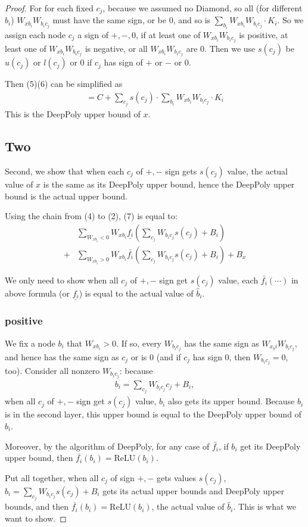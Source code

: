 \documentclass[]{article}
\theoremstyle{definition}
\newcommand{\ReLU}{\mathrm{ReLU}}
\begin{document}
\begin{proof}
For for each fixed $c_j$, because we assumed no Diamond, so all (for different $b_i$) $W_{xb_i}W_{b_ic_j}$ must have the same sign, or be $0$, and so is $\sum_{b_i}W_{xb_i}W_{b_ic_j}\cdot K_i$. So we assign each node $c_j$ a sign of $+,-,0$,  if at least one of $W_{xb_i}W_{b_ic_j}$ is positive, at least one of $W_{xb_i}W_{b_ic_j}$ is negative, or all $W_{xb_i}W_{b_ic_j}$ are 0. Then we use $s(c_j)$ be $u(c_j)$ or $l(c_j)$ or $0$ if $c_j$ has sign of $+$ or $-$ or $0$.



Then (5)(6) can be simplified as \begin{align}
	=C+\sum_{c_j}s(c_j)\cdot\sum_{b_i}W_{xb_i}W_{b_ic_j}\cdot K_i
\end{align} This is the DeepPoly upper bound of $x$.

\subsection*{Two} Second, we show that when each $c_j$ of $+,-$ sign gets $s(c_j)$ value, the actual value of $x$ is the same as its DeepPoly upper bound, hence the DeepPoly upper bound is the actual upper bound.

Using the chain from (4) to (2), (7) is equal to: \begin{align*}
&\sum_{W_{xb_i}<0}W_{xb_i}\underline{f_i}(\sum_{c_j}W_{b_ic_j}s(c_j)+B_i)\\
+&\sum_{W_{xb_i}>0}W_{xb_i}\bar{f_i}(\sum_{c_j}W_{b_ic_j}s(c_j)+B_i)+B_x
\end{align*} 

We only need to show when all $c_j$ of $+,-$ sign get $s(c_j)$ value, each $\bar{f_i}(\cdots)$ in above formula (or $\underline{f_i}$) is equal to the actual value of $\hat{b}_i$. 

\subsubsection*{positive} We fix a node $b_i$ that $W_{xb_i}>0$. If so, every $W_{b_ic_j}$ has the same sign as $W_{x_bi}W_{b_ic_j}$, and hence has the same sign as $c_j$ or is $0$ (and if $c_j$ has sign $0$, then $W_{b_ic_j}=0$, too). Consider all nonzero $W_{b_ic_j}$: because \begin{align}
	b_i = \sum_{c_j} W_{b_ic_j}c_j+B_i,
\end{align}  when all $c_j$ of $+,-$ sign get $s(c_j)$ value, $b_i$ also gets its upper bound. Because $b_i$ is in the second layer, this upper bound is equal to the DeepPoly upper bound of $b_i$. 


Moreover, by the algorithm of DeepPoly, for any case of $\bar{f_i}$, if $b_i$ get its DeepPoly upper bound, then $\bar{f_i}(b_i)=\ReLU(b_i)$. 

Put all together, when all $c_j$ of sign $+,-$ gets values $s(c_j)$, $b_i=\sum_{c_j}W_{b_ic_j}s(c_j)+B_i$ gets its actual upper bounds and DeepPoly upper bounds, and then  $\bar{f_i}(b_i)=\ReLU(b_i)$, the actual value of $\hat{b}_i$. This is what we want to show.
\end{proof}
\end{document}
